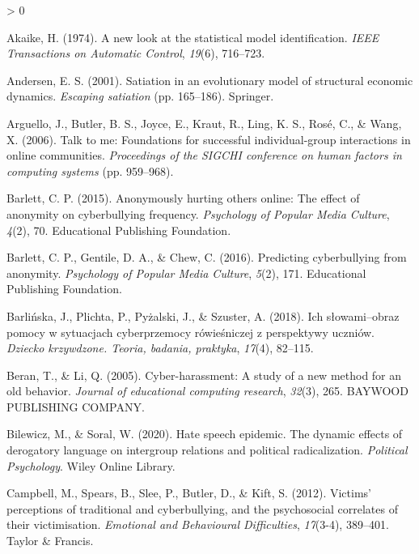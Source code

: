 \documentclass[
  10pt,
  dvipsnames]{scrartcl}
\newlength{\cslhangindent}
\newenvironment{CSLReferences}[2] %
 {%
  \setlength{\parindent}{0pt}
  \ifodd #1 \everypar{\setlength{\hangindent}{\cslhangindent}}\ignorespaces\fi
  \ifnum #2 > 0
  \setlength{\parskip}{#2\baselineskip}
  \fi
 }%
 {}
\begin{document}
\hypertarget{refs}{}
\begin{CSLReferences}{1}{0}
\leavevmode\hypertarget{ref-Akaike1974model}{}%
Akaike, H. (1974). A new look at the statistical model identification.
\emph{IEEE Transactions on Automatic Control}, \emph{19}(6), 716--723.

\leavevmode\hypertarget{ref-andersen2001satiation}{}%
Andersen, E. S. (2001). Satiation in an evolutionary model of structural
economic dynamics. \emph{Escaping satiation} (pp. 165--186). Springer.

\leavevmode\hypertarget{ref-arguello2006talk}{}%
Arguello, J., Butler, B. S., Joyce, E., Kraut, R., Ling, K. S., Rosé,
C., \& Wang, X. (2006). Talk to me: Foundations for successful
individual-group interactions in online communities. \emph{Proceedings
of the SIGCHI conference on human factors in computing systems} (pp.
959--968).

\leavevmode\hypertarget{ref-barlett2015anonymously}{}%
Barlett, C. P. (2015). Anonymously hurting others online: The effect of
anonymity on cyberbullying frequency. \emph{Psychology of Popular Media
Culture}, \emph{4}(2), 70. Educational Publishing Foundation.

\leavevmode\hypertarget{ref-barlett2016predicting}{}%
Barlett, C. P., Gentile, D. A., \& Chew, C. (2016). Predicting
cyberbullying from anonymity. \emph{Psychology of Popular Media
Culture}, \emph{5}(2), 171. Educational Publishing Foundation.

\leavevmode\hypertarget{ref-barlinska2018slowami}{}%
Barlińska, J., Plichta, P., Pyżalski, J., \& Szuster, A. (2018). Ich
s{ł}owami--obraz pomocy w sytuacjach cyberprzemocy r{ó}wie{ś}niczej z
perspektywy uczni{ó}w. \emph{Dziecko krzywdzone. Teoria, badania,
praktyka}, \emph{17}(4), 82--115.

\leavevmode\hypertarget{ref-beran2005cyber}{}%
Beran, T., \& Li, Q. (2005). Cyber-harassment: A study of a new method
for an old behavior. \emph{Journal of educational computing research},
\emph{32}(3), 265. BAYWOOD PUBLISHING COMPANY.

\leavevmode\hypertarget{ref-bilewicz2020hate}{}%
Bilewicz, M., \& Soral, W. (2020). Hate speech epidemic. The dynamic
effects of derogatory language on intergroup relations and political
radicalization. \emph{Political Psychology}. Wiley Online Library.

\leavevmode\hypertarget{ref-campbell2012victims}{}%
Campbell, M., Spears, B., Slee, P., Butler, D., \& Kift, S. (2012).
Victims' perceptions of traditional and cyberbullying, and the
psychosocial correlates of their victimisation. \emph{Emotional and
Behavioural Difficulties}, \emph{17}(3-4), 389--401. Taylor \& Francis.


\end{CSLReferences}
\end{document}
